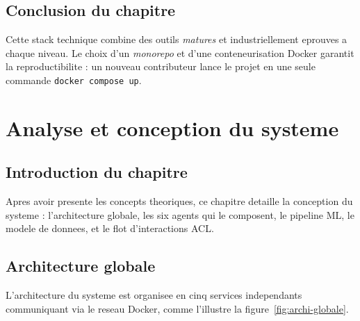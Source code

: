 \documentclass[12pt,a4paper,oneside]{report}
\begin{document}
\section{Conclusion du chapitre}
Cette stack technique combine des outils \emph{matures} et industriellement
eprouves a chaque niveau. Le choix d'un \emph{monorepo} et d'une
conteneurisation Docker garantit la reproductibilite : un nouveau
contributeur lance le projet en une seule commande \texttt{docker compose up}.

\chapter{Analyse et conception du systeme}

\section{Introduction du chapitre}
Apres avoir presente les concepts theoriques, ce chapitre detaille la
conception du systeme : l'architecture globale, les six agents qui le
composent, le pipeline ML, le modele de donnees, et le flot d'interactions
ACL.

\section{Architecture globale}

L'architecture du systeme est organisee en cinq services independants
communiquant via le reseau Docker, comme l'illustre la
figure~\ref{fig:archi-globale}.
\end{document}
